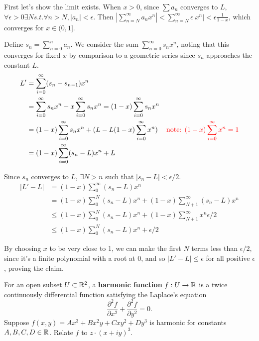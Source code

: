 \documentclass{homework}
\begin{document}
\begin{solution}
First let's show the limit exists. When $x > 0$, since $\sum a_n$ converges to $L$, $\forall \epsilon>0 \exists N s.t. \forall n > N, |a_n| < \epsilon.$ Then $|\sum_{n=N}^\infty a_nx^n| < \sum_{n=N}^\infty \epsilon|x^n| < \epsilon\frac{1}{1-x}$, which converges for $x\in (0, 1].$

Define $s_n = \sum_{n=0}^n a_n$. We consider the sum $\sum_{n=0}^\infty s_nx^n$, noting that this converges for fixed $x$ by comparison to a geometric series since $s_n$ approaches the constant $L$.
\begin{align*}
L' &= \sum_{i=0}^\infty (s_n-s_{n-1})x^n\\
&=  \sum_{i=0}^\infty s_nx^n - x\sum_{i=0}^\infty s_{n}x^n
= (1-x)\sum_{i=0}^\infty s_nx^n\\
&= (1-x)\sum_{i=0}^\infty s_nx^n + (L - L(1-x)\sum_{i=0}^\infty x^n) &\color{red}\text{note: } (1-x)\sum_{i=0}^\infty x^n=1\\
&= (1-x)\sum_{i=0}^\infty (s_n - L)x^n + L
\end{align*}

Since $s_n$ converges to $L$,  $\exists N>n$ such that $|s_n - L| < \epsilon/2$.
\begin{align*}
|L' - L| &= (1 - x)\sum_0^\infty (s_n - L)x^n\\
&= (1 - x)\sum_0^N (s_n - L)x^n + (1 - x)\sum_{N+1}^\infty (s_n - L)x^n \\
&\leq (1 - x)\sum_0^N (s_n - L)x^n + (1 - x)\sum_{N+1}^\infty x^n \epsilon/2\\
&\leq (1 - x)\sum_0^N (s_n - L)x^n + \epsilon/2
\end{align*}

By choosing $x$ to be very close to 1, we can make the first $N$ terms less than $\epsilon/2$, since it's a finite polynomial with a root at 0, and so $|L' - L| \leq \epsilon$ for all positive $\epsilon$, proving the claim.


\end{solution}
\begin{problem}\label{harmonic-function}
  For an open subset $U \subset \mathbb{R}^2$, a \textbf{harmonic function} $f : U \to \mathbb{R}$ is a twice continuously differential function satisfying the Laplace's equation
  \[
    \frac{\partial^2 f}{\partial x^2} + \frac{\partial^2 f}{\partial y^2} = 0.
  \]
  Suppose $f(x,y) = Ax^3 + Bx^2 y + C xy^2 + D y^3$ is harmonic for constants $A, B, C, D \in \mathbb{R}$.  Relate $f$ to $z \cdot (x + iy)^3$.
\end{problem}
\end{document}
